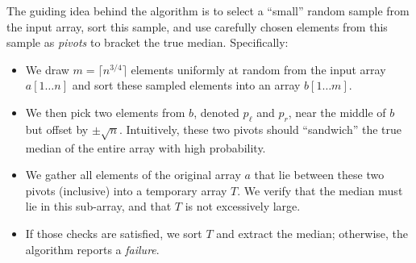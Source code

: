The guiding idea behind the algorithm is to select a “small” random sample from the input array, sort this sample, and use carefully chosen elements from this sample as \emph{pivots} to bracket the true median. Specifically:
\begin{itemize}
    \item We draw \( m = \lceil n^{3/4} \rceil \) elements uniformly at random from the input array \( a[1 \dots n] \) and sort these sampled elements into an array \( b[1 \dots m] \).
    \item We then pick two elements from \( b \), denoted \( p_\ell \) and \( p_r \), near the middle of \( b \) but offset by \(\pm \sqrt{n}\). Intuitively, these two pivots should “sandwich” the true median of the entire array with high probability.
    \item We gather all elements of the original array \( a \) that lie between these two pivots (inclusive) into a temporary array \(T\). We verify that the median must lie in this sub-array, and that \(T\) is not excessively large.
    \item If those checks are satisfied, we sort \(T\) and extract the median; otherwise, the algorithm reports a \emph{failure}.
\end{itemize}
